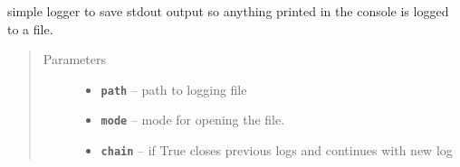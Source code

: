 \documentclass[letterpaper,10pt,english]{sphinxmanual}
\begin{document}
\begin{fulllineitems}
\label{RRtoolbox.lib:RRtoolbox.lib.root.stdoutLOG}
simple logger to save stdout output
so anything printed in the console is logged to a file.
\begin{quote}\begin{description}
\item[{Parameters}] \leavevmode\begin{itemize}
\item {} 
\textbf{\texttt{path}} -- path to logging file

\item {} 
\textbf{\texttt{mode}} -- mode for opening the file.

\item {} 
\textbf{\texttt{chain}} -- if True closes previous logs and continues with new log

\end{itemize}

\end{description}\end{quote}

\begin{fulllineitems}
\label{RRtoolbox.lib:RRtoolbox.lib.root.stdoutLOG.close}
\end{fulllineitems}


\begin{fulllineitems}
\label{RRtoolbox.lib:RRtoolbox.lib.root.stdoutLOG.flush}
\end{fulllineitems}


\begin{fulllineitems}
\label{RRtoolbox.lib:RRtoolbox.lib.root.stdoutLOG.printline}
\end{fulllineitems}


\begin{fulllineitems}
\label{RRtoolbox.lib:RRtoolbox.lib.root.stdoutLOG.printlines}
\end{fulllineitems}


\begin{fulllineitems}
\label{RRtoolbox.lib:RRtoolbox.lib.root.stdoutLOG.write}
\end{fulllineitems}


\end{fulllineitems}
\end{document}
